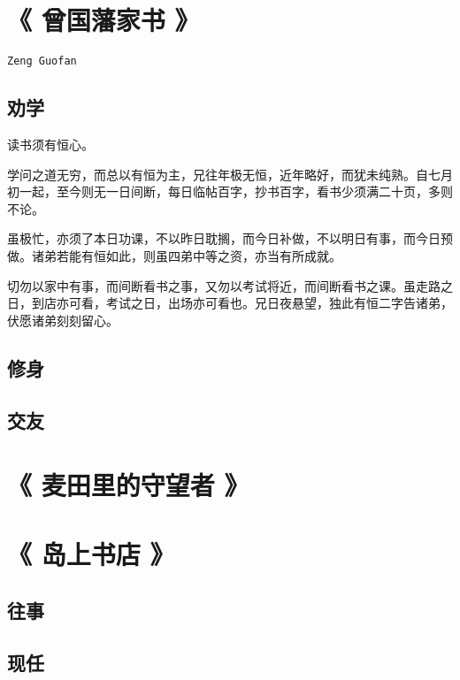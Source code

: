 \documentclass[UTF8,a4paper,8pt]{ctexart}
\begin{document}
	\section{《 曾国藩家书 》   }	
		\verb|Zeng Guofan |
		\subsection{劝学}
			读书须有恒心。
			
			学问之道无穷，而总以有恒为主，兄往年极无恒，近年略好，而犹未纯熟。自七月初一起，至今则无一日间断，每日临帖百字，抄书百字，看书少须满二十页，多则不论。
			
			虽极忙，亦须了本日功课，不以昨日耽搁，而今日补做，不以明日有事，而今日预做。诸弟若能有恒如此，则虽四弟中等之资，亦当有所成就。
			
			切勿以家中有事，而间断看书之事，又勿以考试将近，而间断看书之课。虽走路之日，到店亦可看，考试之日，出场亦可看也。兄日夜悬望，独此有恒二字告诸弟，伏愿诸弟刻刻留心。
		\subsection{修身}
		\subsection{交友}

	\section{《 麦田里的守望者 》   }	
	
	
	\section{《 岛上书店 》   }	
		\subsection{往事}
			
		\subsection{现任}
		
		
\end{document}
